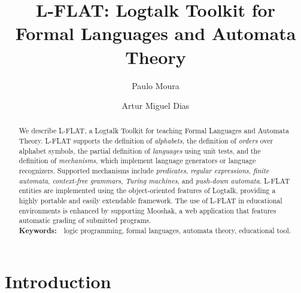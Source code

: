 \documentclass{llncs}
\begin{document}
\title{L-FLAT: Logtalk Toolkit for\\Formal Languages and Automata Theory}

\author{Paulo Moura \and Artur Miguel Dias}


\maketitle


\begin{abstract}
We describe L-FLAT, a Logtalk Toolkit for teaching Formal Languages and Automata Theory. L-FLAT supports the definition of \textsl{alphabets}, the definition of \textsl{orders} over alphabet symbols, the partial definition of \textsl{languages} using unit tests, and the definition of \textsl{mechanisms}, which implement language generators or language recognizers. Supported mechanisms include \textsl{predicates}, \textsl{regular expressions}, \textsl{finite automata}, \textsl{context-free grammars}, \textsl{Turing machines}, and \textsl{push-down automata}. L-FLAT entities are implemented using the object-oriented features of Logtalk, providing a highly portable and easily extendable framework. The use of L-FLAT in educational environments is enhanced by supporting Mooshak, a web application that features automatic grading of submitted programs.\\

\noindent
\textbf{Keywords:}\ \ logic programming, formal languages, automata theory, educational tool.
\end{abstract}


\section{Introduction}
\end{document}
